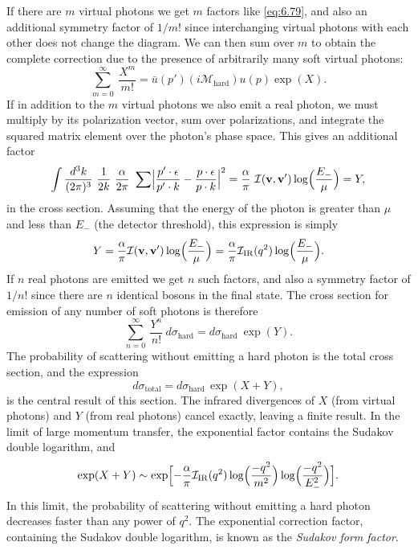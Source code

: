 If there are $m$ virtual photons we get $m$ factors like \eqref{eq:6.79}, and
also an additional symmetry factor of $1/m!$ since interchanging virtual
photons with each other does not change the diagram.  We can then sum over
$m$ to obtain the complete correction due to the presence of arbitrarily many
soft virtual photons:
\begin{equation}
  \sum_{m=0}^{\infty}\ \frac{X^m}{m!}
    = \bar{u}(p')(i\mathcal{M}_{\mathrm{hard}})u(p)\exp(X) .
  \label{eq:6.80}
\end{equation}
If in addition to the $m$ virtual photons we also emit a real photon, we must
multiply by its polarization vector, sum over polarizations, and integrate the
squared matrix element over the photon's phase space.  This gives an
additional factor
\begin{equation}
  \int \frac{d^3k}{(2\pi)^3}\ \frac{1}{2k}\ \frac{\alpha}{2\pi}\ \sum
    \Bigl| \frac{p'\cdot\epsilon}{p'\cdot k} - \frac{p\cdot\epsilon}{p\cdot k}
      \Bigr|^2
  = \frac{\alpha}{\pi}\ \mathcal{I}(\mathbf{v},\mathbf{v}')\log\Bigl(
    \frac{E_{-}}{\mu} \Bigr)
  = Y ,
  \label{eq:6.81}
\end{equation}
in the cross section.  Assuming that the energy of the photon is greater than
$\mu$ and less than $E_{-}$ (the detector threshold), this expression is
simply
\begin{equation}
  Y = \frac{\alpha}{\pi}\mathcal{I}(\mathbf{v},\mathbf{v}')\log\Bigl(
    \frac{E_{-}}{\mu} \Bigr)
  = \frac{\alpha}{\pi}\mathcal{I}_{\mathrm{IR}}(q^2)\log\Bigl(
    \frac{E_{-}}{\mu} \Bigr) .
  \label{eq:6.82}
\end{equation}
If $n$ real photons are emitted we get $n$ such factors, and also a symmetry
factor of $1/n!$ since there are $n$ identical bosons in the final state.  The
cross section for emission of any number of soft photons is therefore
\begin{equation}
  \sum_{n=0}^{\infty}\ \frac{Y^n}{n!}\ d\sigma_{\mathrm{hard}}
    = d\sigma_{\mathrm{hard}}\ \exp(Y) .
  \label{eq:6.83}
\end{equation}
The probability of scattering without emitting a hard photon is the total
cross section, and the expression
\begin{equation}
  d\sigma_{\mathrm{total}} = d\sigma_{\mathrm{hard}}\,
    \exp(X + Y) ,
  \label{eq:6.84}
\end{equation}
is the central result of this section.  The infrared divergences of $X$ (from
virtual photons) and $Y$ (from real photons) cancel exactly, leaving a finite
result.  In the limit of large momentum transfer, the exponential factor
contains the Sudakov double logarithm, and
\begin{equation}
  \exp(X+Y) \sim \exp\Bigl[ -\frac{\alpha}{\pi}
    \mathcal{I}_{\mathrm{IR}}(q^2)\log\Bigl( \frac{-q^2}{m^2} \Bigr)
      \log\Bigl( \frac{-q^2}{E_{-}^2} \Bigr) \Bigr] .
  \label{eq:6.85}
\end{equation}
In this limit, the probability of scattering without emitting a hard photon
decreases faster than any power of $q^2$.  The exponential correction factor,
containing the Sudakov double logarithm, is known as the \emph{Sudakov form
factor}.

